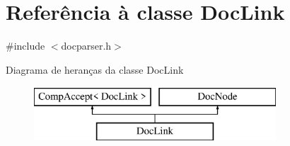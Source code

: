 \hypertarget{class_doc_link}{\section{Referência à classe Doc\-Link}
\label{class_doc_link}
}


{\ttfamily \#include $<$docparser.\-h$>$}

Diagrama de heranças da classe Doc\-Link\begin{figure}[H]
\begin{center}
\leavevmode
\includegraphics[height=2.000000cm]{class_doc_link}
\end{center}
\end{figure}
